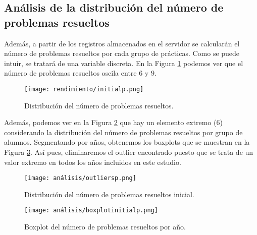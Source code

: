 \subsection{Análisis de la distribución del número de problemas resueltos}\label{sec:NumProblems}

Además, a partir de los registros almacenados en el servidor se calcularán el número de problemas resueltos por cada grupo de prácticas. Como se puede intuir, se tratará de una variable discreta. En la Figura \ref{fig:initialp} podemos ver que el número de problemas resueltos oscila entre $6$ y $9$.

\begin{figure}[H]
    \centering
    \texttt{[image: rendimiento/initialp.png]}
    \caption{Distribución del número de problemas resueltos.}
    \label{fig:initialp}
\end{figure}

Además, podemos ver en la Figura \ref{fig:outliersp} que hay un elemento extremo ($6$) considerando la distribución del número de problemas resueltos por grupo de alumnos. Segmentando por años, obtenemos los boxplots que se muestran en la Figura \ref{fig:boxplotproblemsyear}. Así pues, eliminaremos el outlier encontrado puesto que se trata de un valor extremo en todos los años incluidos en este estudio.

\begin{figure}[H]
    \centering
    \texttt{[image: análisis/outliersp.png]}
    \caption{Distribución del número de problemas resueltos inicial.}
    \label{fig:outliersp}
\end{figure}

\begin{figure}[H]
    \centering
    \texttt{[image: análisis/boxplotinitialp.png]}
    \caption{Boxplot del número de problemas resueltos por año.}
    \label{fig:boxplotproblemsyear}
\end{figure}